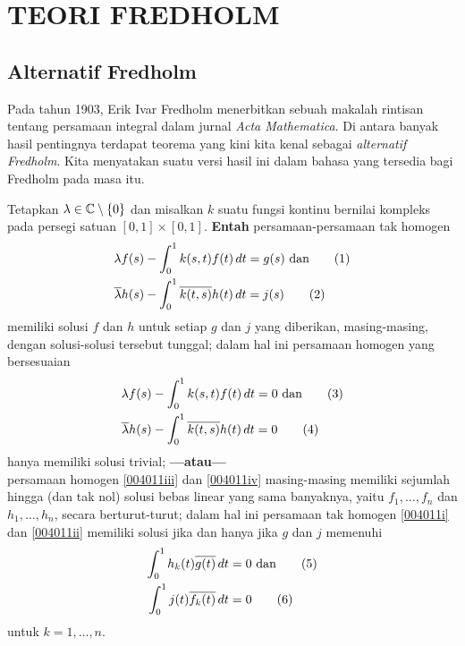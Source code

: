 \chapter{TEORI FREDHOLM}

\section{Alternatif Fredholm}

Pada tahun 1903, Erik Ivar Fredholm menerbitkan sebuah makalah rintisan tentang persamaan integral dalam jurnal
\emph{Acta Mathematica}. Di antara banyak hasil pentingnya terdapat teorema yang kini kita kenal sebagai
\emph{alternatif Fredholm}. Kita menyatakan suatu versi hasil ini dalam bahasa
yang tersedia bagi Fredholm pada masa itu.

\begin{prop}\label{004011} Tetapkan $\lambda \in \mathbb{C}\setminus\{0\}$ dan misalkan $k$ suatu fungsi kontinu bernilai kompleks
pada persegi satuan $[0,1] \times [0,1]$. \textbf{Entah} persamaan-persamaan
tak homogen
 \begin{align}
   \lambda f(s) &- \int_0^1 k(s,t)f(t)\,dt = g(s)\label{004011i} \text{ dan}    \tag{1}\\
   \conj{\lambda} h(s) &- \int_0^1 \conj{k(t,s)}h(t)\,dt = j(s)\label{004011ii} \tag{2}
 \end{align}
memiliki solusi $f$ dan $h$ untuk setiap $g$ dan $j$ yang diberikan, masing-masing, dengan solusi-solusi tersebut
tunggal; dalam hal ini persamaan homogen yang bersesuaian
 \begin{align} \lambda f(s) &- \int_0^1 k(s,t)f(t)\,dt = 0\label{004011iii} \text{ dan} \tag{3}\\
        \conj{\lambda} h(s) &- \int_0^1 \conj{k(t,s)}h(t)\,dt = 0\label{004011iv} \tag{4}
 \end{align}
hanya memiliki solusi trivial; \textbf{---atau---}\\
persamaan homogen \eqref{004011iii} dan \eqref{004011iv} masing-masing memiliki
sejumlah hingga (dan tak nol) solusi bebas linear yang sama banyaknya, yaitu $f_1,\dots,f_n$ dan $h_1,\dots,h_n$,
secara berturut-turut; dalam hal ini persamaan tak homogen \eqref{004011i} dan
\eqref{004011ii} memiliki solusi jika dan hanya jika $g$ dan $j$ memenuhi
 \begin{align} \int_0^1 h_k(t)\conj{g(t)}\,dt &= 0\label{004011v} \text{ dan} \tag{5}\\
              \int_0^1 j(t) \conj{f_k(t)}\,dt &= 0\label{004011vi} \tag{6}
 \end{align}
untuk $k = 1, \dots, n$.
\end{prop}

